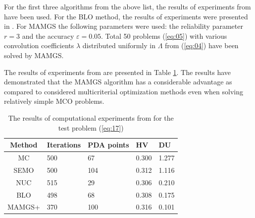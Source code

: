 \documentclass[procedia]{easychair}
\begin{document}
For the first three algorithms from the above list, the results of experiments from \cite{c20} have been used. For the BLO method, the results of experiments were presented in \cite{c42}. For MAMGS the following parameters were used: the reliability parameter $r = 3$ and the accuracy  $\varepsilon = 0.05$. Total 50 problems (\ref{eq:05}) with various convolution coefficients $\lambda$ distributed uniformly in $\Lambda$ from (\ref{eq:04}) have been solved by MAMGS.\par

The results of experiments from \cite{c14} are presented in Table \ref{tab:01}. The results have demonstrated that the MAMGS algorithm has a considerable advantage as compared to considered multicriterial optimization methods even when solving relatively simple MCO problems.

\begin{table}[t]
\centering
\caption{The results of computational experiments from \cite{c14} for the test problem (\ref{eq:17})}
\label{tab:01}
\begin{tabular}{cllll}
\hline
\textbf{Method} & \textbf{Iterations} & \textbf{PDA points} & \textbf{HV} & \textbf{DU} \\ \hline
MC              & 500                 & 67                  & 0.300       & 1.277       \\
SEMO            & 500                 & 104                 & 0.312       & 1.116       \\
NUC             & 515                 & 29                  & 0.306       & 0.210       \\
BLO             & 498                 & 68                  & 0.308       & 0.175       \\
MAMGS+          & 370                 & 100                 & 0.316       & 0.101       \\ \hline
\end{tabular}
\end{table}
\end{document}

